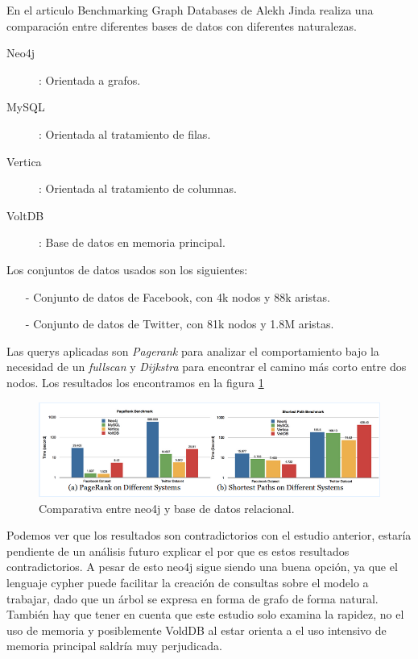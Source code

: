 \documentclass[12pt]{article} %
\begin{document}
En el articulo Benchmarking Graph Databases de Alekh Jinda \cite{graphvsrelational} realiza una comparación entre diferentes bases de datos con diferentes naturalezas.

\begin{description}
\item[Neo4j]: Orientada a grafos.
\item[MySQL]: Orientada al tratamiento de filas.
\item[Vertica]: Orientada al tratamiento de columnas.
\item[VoltDB]: Base de datos en memoria principal.
\end{description}

Los conjuntos de datos usados son los siguientes:
\begin{itemize}
\item[-] Conjunto de datos de Facebook, con 4k nodos y 88k aristas.
\item[-] Conjunto de datos de Twitter, con 81k nodos y 1.8M aristas.
\end{itemize}

Las querys aplicadas son \textit{Pagerank} para analizar el comportamiento bajo la necesidad de un \textit{fullscan} y \textit{Dijkstra} para encontrar el camino más corto entre dos nodos. Los resultados los encontramos en la figura \ref{fig:benchmarkingneo4j}

\begin{figure}[ht!]
\center
\includegraphics[scale=0.5]{benchmarkingneo4j.png}
\caption{Comparativa entre neo4j y base de datos relacional.}
\label{fig:benchmarkingneo4j}
\end{figure}

Podemos ver que los resultados son contradictorios con el estudio anterior, estaría pendiente de un análisis futuro explicar el por que es estos resultados contradictorios. A pesar de esto neo4j sigue siendo una buena opción, ya que el lenguaje cypher puede facilitar la creación de consultas sobre el modelo a trabajar, dado que un árbol se expresa en forma de grafo de forma natural. También hay que tener en cuenta que este estudio solo examina la rapidez, no el uso de memoria y posiblemente VoldDB al estar orienta a el uso intensivo de memoria principal saldría muy perjudicada.
\end{document}

